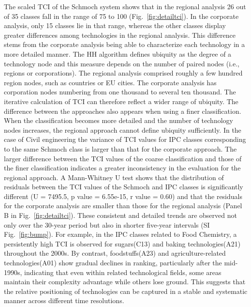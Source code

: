The scaled TCI of the Schmoch system shows that in the regional analysis 26 out of 35 classes fall in the range of 75 to 100 (Fig.~\ref{fig:detailtci}). 
In the corporate analysis, only 15 classes lie in that range, whereas the other classes display greater differences among technologies in the regional analysis. 
This difference stems from the corporate analysis being able to characterize each technology in a more detailed manner. 
The HH algorithm defines ubiquity as the degree of a technology node and this measure depends on the number of paired nodes (i.e., regions or corporations). 
The regional analysis comprised roughly a few hundred region nodes, such as countries or EU cities\cite{Hidalgo2021,Daniel2020technological}.
The corporate analysis has corporation nodes numbering from one thousand to several ten thousand. The iterative calculation of TCI can therefore reflect a wider range of ubiquity.
The difference between the approaches also appears when using a finer classification. When the classification becomes more detailed and the number of technology nodes increases, the regional approach cannot define ubiquity sufficiently. 
In the case of Civil engineering the variance of TCI values for IPC classes corresponding to the same Schmoch class is larger than that for the corporate approach. 
The larger difference between the TCI values of the coarse classification and those of the finer classification indicates a greater inconsistency in the evaluation for the regional approach. 
A Mann-Whitney U test shows that the distribution of residuals between the TCI values of the Schmoch and IPC classes is significantly different (U = 7495.5, p value = 6.55e-15, r value = 0.60) and that the residuals for the corporate analysis are smaller than those for the regional analysis (Panel B in Fig.~\ref{fig:detailtci}).
These consistent and detailed trends are observed not only over the 30-year period but also in shorter five-year intervals (SI Fig.~\ref{fig:bump}).
For example, in the IPC classes related to Food Chemistry, a persistently high TCI is observed for sugars(C13) and baking technologies(A21) throughout the 2000s.
By contrast, foodstuffs(A23) and agriculture-related technologies(A01) show gradual declines in ranking, particularly after the mid-1990s, indicating that even within related technological fields, some areas maintain their complexity advantage while others lose ground.
This suggests that the relative positioning of technologies can be captured in a stable and systematic manner across different time resolutions.

